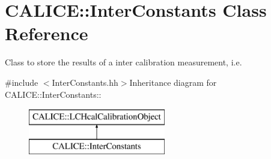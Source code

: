 \section{CALICE::InterConstants Class Reference}
\label{classCALICE_1_1InterConstants}


Class to store the results of a inter calibration measurement, i.e.  


{\ttfamily \#include $<$InterConstants.hh$>$}Inheritance diagram for CALICE::InterConstants::\begin{figure}[H]
\begin{center}
\leavevmode
\includegraphics[height=2cm]{classCALICE_1_1InterConstants}
\end{center}
\end{figure}

